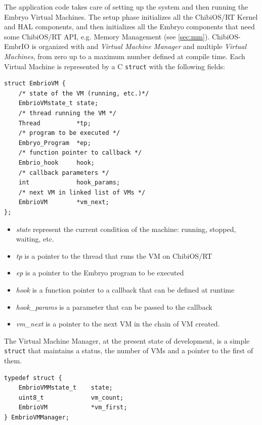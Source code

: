 \documentclass[a4paper,10pt]{article}
\begin{document}
\begin{multicols}{2}
The application code takes care of setting up the system and then running the Embryo Virtual Machines. The setup phase initializes all the ChibiOS/RT Kernel and HAL components, and then initializes all the Embryo components that need some ChibiOS/RT API, e.g. Memory Management (see \ref{sec:mm}).\newline
ChibiOS-EmbrIO is organized with and \textit{Virtual Machine Manager} and multiple \textit{Virtual Machines}, from zero up to a maximum number defined at compile time. Each Virtual Machine is represented by a C \texttt{struct} with the following fields:

\begin{lstlisting}[caption={EmbrIO VM}]
struct EmbrioVM {
	/* state of the VM (running, etc.)*/
	EmbrioVMstate_t	state;
	/* thread running the VM */
	Thread			*tp;
	/* program to be executed */
	Embryo_Program	*ep;
	/* function pointer to callback */
	Embrio_hook		hook;
	/* callback parameters */
	int				hook_params;
	/* next VM in linked list of VMs */
	EmbrioVM		*vm_next;
};

\end{lstlisting}

\begin{itemize}
\item \textit{state} represent the current condition of the machine: running, stopped, waiting, etc.
\item \textit{tp} is a pointer to the thread that runs the VM on ChibiOS/RT
\item \textit{ep} is a pointer to the Embryo program to be executed
\item \textit{hook} is a function pointer to a callback that can be defined at runtime
\item \textit{hook\_params} is a parameter that can be passed to the callback
\item \textit{vm\_next} is a pointer to the next VM in the chain of VM created.
\end{itemize}


The Virtual Machine Manager, at the present state of development, is a simple \texttt{struct} that maintains a status, the number of VMs and a pointer to the first of them.

\begin{lstlisting}[caption={EmbrIO VM}]
typedef struct {
	EmbrioVMMstate_t	state;
	uint8_t				vm_count;
	EmbrioVM			*vm_first;
} EmbrioVMManager;
\end{lstlisting}




\end{multicols}
\end{document}
